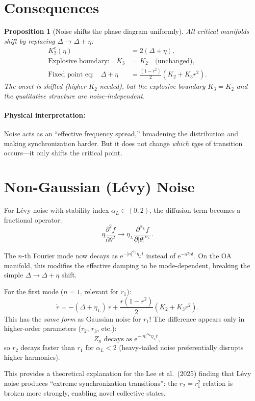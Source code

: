 \documentclass[11pt]{article}
\newcommand{\ee}{\mathrm{e}}
\newtheorem{proposition}{Proposition}
\begin{document}
\section{Consequences}

\begin{proposition}[Noise shifts the phase diagram uniformly]
  All critical manifolds shift by replacing $\Delta\to\Delta+\eta$:
  \begin{align}
    K_2^{\mathrm{c}}(\eta) &= 2(\Delta+\eta), \\
    \text{Explosive boundary:}\quad K_3 &= K_2\quad\text{(unchanged)}, \\
    \text{Fixed point eq:}\quad \Delta+\eta &= \frac{(1-r^2)}{2}(K_2+K_3 r^2).
  \end{align}
  The onset is shifted (higher $K_2$ needed), but the explosive boundary
  $K_3=K_2$ and the qualitative structure are noise-independent.
\end{proposition}

\paragraph{Physical interpretation:} Noise acts as an ``effective frequency
spread,'' broadening the distribution and making synchronization harder.  But
it does not change \emph{which type} of transition occurs---it only shifts
the critical point.

\section{Non-Gaussian (L\'{e}vy) Noise}

For L\'{e}vy noise with stability index $\alpha_L\in(0,2)$, the diffusion
term becomes a fractional operator:
\begin{equation}
  \eta\frac{\partial^2 f}{\partial\theta^2}
  \to \eta_L\frac{\partial^{\alpha_L} f}{\partial|\theta|^{\alpha_L}}.
\end{equation}

The $n$-th Fourier mode now decays as $\ee^{-|n|^{\alpha_L}\eta_L t}$
instead of $\ee^{-n^2\eta t}$.  On the OA manifold, this modifies the
effective damping to be mode-dependent, breaking the simple
$\Delta\to\Delta+\eta$ shift.

For the first mode ($n=1$, relevant for $r_1$):
\begin{equation}
  \dot{r} = -(\Delta+\eta_L)\,r + \frac{r(1-r^2)}{2}(K_2+K_3 r^2).
\end{equation}
This has the \emph{same form} as Gaussian noise for $r_1$!  The difference
appears only in higher-order parameters ($r_2$, $r_3$, etc.):
\begin{equation}
  Z_n \text{ decays as } \ee^{-|n|^{\alpha_L}\eta_L t},
\end{equation}
so $r_2$ decays faster than $r_1$ for $\alpha_L < 2$ (heavy-tailed noise
preferentially disrupts higher harmonics).

This provides a theoretical explanation for the Lee et al.\ (2025) finding
that L\'{e}vy noise produces ``extreme synchronization transitions'': the
$r_2 = r_1^2$ relation is broken more strongly, enabling novel collective
states.
\end{document}
